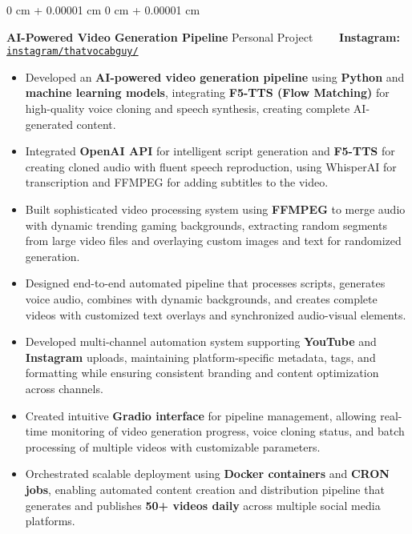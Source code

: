 \documentclass[10pt, letterpaper]{article}
\newenvironment{highlights}{
    \begin{itemize}[
        topsep=0.10 cm,
        parsep=0.10 cm,
        partopsep=0pt,
        itemsep=0pt,
        leftmargin=0 cm + 10pt
    ]
}{
    \end{itemize}
} %
\newenvironment{onecolentry}{
    \begin{adjustwidth}{
        0 cm + 0.00001 cm
    }{
        0 cm + 0.00001 cm
    }
}{
    \end{adjustwidth}
} %
\begin{document}
\vspace{0.15 cm}

\begin{onecolentry}
	\textbf{AI-Powered Video Generation Pipeline} \hfill Personal Project \ \ \ \ \textbf{Instagram:} \href{https://www.instagram.com/thatvocabguy/}{\texttt{instagram/thatvocabguy/}}
	\begin{highlights}
		\item Developed an \textbf{AI-powered video generation pipeline} using \textbf{Python} and \textbf{machine learning models}, integrating \textbf{F5-TTS (Flow Matching)} for high-quality voice cloning and speech synthesis, creating complete AI-generated content.
		\item Integrated \textbf{OpenAI API} for intelligent script generation and \textbf{F5-TTS} for creating cloned audio with fluent speech reproduction, using WhisperAI for transcription and FFMPEG for adding subtitles to the video.
		\item Built sophisticated video processing system using \textbf{FFMPEG} to merge audio with dynamic trending gaming backgrounds, extracting random segments from large video files and overlaying custom images and text for randomized generation.
		\item Designed end-to-end automated pipeline that processes scripts, generates voice audio, combines with dynamic backgrounds, and creates complete videos with customized text overlays and synchronized audio-visual elements.
		\item Developed multi-channel automation system supporting \textbf{YouTube} and \textbf{Instagram} uploads, maintaining platform-specific metadata, tags, and formatting while ensuring consistent branding and content optimization across channels.
		\item Created intuitive \textbf{Gradio interface} for pipeline management, allowing real-time monitoring of video generation progress, voice cloning status, and batch processing of multiple videos with customizable parameters.
		\item Orchestrated scalable deployment using \textbf{Docker containers} and \textbf{CRON jobs}, enabling automated content creation and distribution pipeline that generates and publishes \textbf{50+ videos daily} across multiple social media platforms.
	\end{highlights}
\end{onecolentry}

\vspace{0.15 cm}
\end{document}
